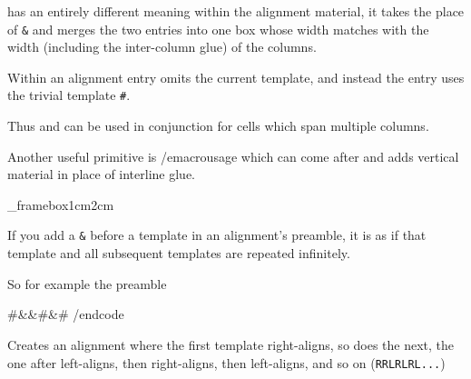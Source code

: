 {{        \macroname\span{} has an entirely different meaning within the alignment material, it takes the place of {\tt\&} and
        merges the two entries into one box whose width matches with the width (including the inter-column glue) of the columns.

        Within an alignment entry \macroname\omit{} omits the current template, and instead the entry uses the trivial template
        {\tt\#}.

        Thus \macroname\span{} and \macroname\omit{} can be used in conjunction for cells which span multiple columns.

        Another useful primitive is \macrousage{}/emacrousage{} which can come after \macroname\cr{}
        and adds {\fifteenit vertical material\/} in place of interline glue.
    \endtextbox

\endslide

\beginslide
    \bheadline

    \textbox\_framebox{1cm}{2cm}{\hsize-2cm}{}
\beginhi
{\tabskip=0pt
\jot
{}}
\endhi
    \endtextbox

    \textbox{}
        {\tabskip=0pt
        \jot
        }
    \endtextbox

\endslide

\beginslide
    \bheadline

    \textbox\empty{1cm}{2cm}{\hsize-2cm}{}
        If you add a {\tt\&} before a template in an alignment's preamble, it is as if that template and all subsequent templates
        are repeated infinitely.

        So for example the preamble

        \begincode
\hfil#&&\hfil#&#\hfil
        /endcode

        Creates an alignment where the first template right-aligns, so does the next, the one after left-aligns, then
        right-aligns, then left-aligns, and so on ({\tt RRLRLRL...})

}}
